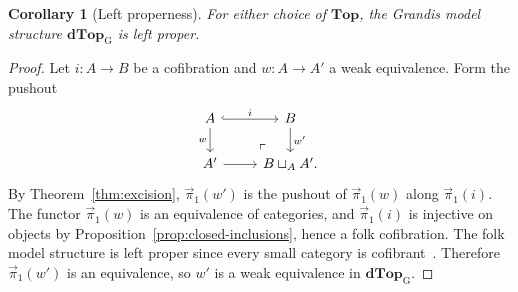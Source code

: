 \documentclass[12pt,a4paper]{amsart}
\newtheorem{corollary}[theorem]{Corollary}
\theoremstyle{definition}
\renewcommand{\vec}{\overrightarrow}
\newcommand{\D}{\mathbf{dTop}}
\newcommand{\MG}{\D_{\mathrm G}}
\newcommand{\PiC}{\vec{\pi}_1}
\begin{document}
\begin{corollary}[Left properness]\label{cor:left-proper}
For either choice of $\mathbf{Top}$, the Grandis model structure $\MG$ is left proper.
\end{corollary}
\begin{proof}
Let $i\colon A\to B$ be a cofibration and $w\colon A\to A'$ a weak equivalence. Form the pushout
\[
\begin{tikzcd}
 A\ar[r,hook,"i"]\ar[d,"w"'] & B\ar[d,"w'"]\\
 A'\ar[r] & B\sqcup_A A'\ar[ul,phantom,"\ulcorner",very near start].
\end{tikzcd}
\]
By Theorem~\ref{thm:excision}, $\PiC(w')$ is the pushout of $\PiC(w)$ along $\PiC(i)$. The functor $\PiC(w)$ is an equivalence of categories, and $\PiC(i)$ is injective on objects by Proposition~\ref{prop:closed-inclusions}, hence a folk cofibration. The folk model structure is left proper since every small category is cofibrant~\cite[Proposition~A.2.4.2]{Lurie2009}. Therefore $\PiC(w')$ is an equivalence, so $w'$ is a weak equivalence in $\MG$.
\end{proof}
\end{document}
